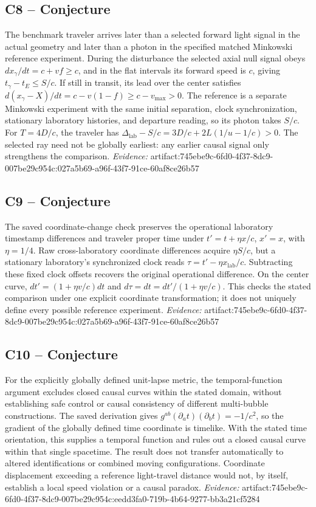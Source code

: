 \documentclass[11pt]{article}
\begin{document}
\subsection{C8 -- Conjecture}
The benchmark traveler arrives later than a selected forward light signal in the actual geometry and later than a photon in the specified matched Minkowski reference experiment.
During the disturbance the selected axial null signal obeys $dx_\gamma/dt=c+vf\geq c$, and in the flat intervals its forward speed is $c$, giving $t_\gamma-t_E\leq S/c$. If still in transit, its lead over the center satisfies $d(x_\gamma-X)/dt=c-v(1-f)\geq c-v_{\max}>0$. The reference is a separate Minkowski experiment with the same initial separation, clock synchronization, stationary laboratory histories, and departure reading, so its photon takes $S/c$. For $T=4D/c$, the traveler has $\Delta_{\mathrm{lab}}-S/c=3D/c+2L(1/u-1/c)>0$. The selected ray need not be globally earliest: any earlier causal signal only strengthens the comparison.
\textit{Evidence: }artifact:745ebe9c-6fd0-4f37-8dc9-007be29c954c:027a5b69-a96f-43f7-91ce-60af8ce26b57
\subsection{C9 -- Conjecture}
The saved coordinate-change check preserves the operational laboratory timestamp differences and traveler proper time under $t'=t+\eta x/c$, $x'=x$, with $\eta=1/4$.
Raw cross-laboratory coordinate differences acquire $\eta S/c$, but a stationary laboratory's synchronized clock reads $\tau=t'-\eta x_{\mathrm{lab}}/c$. Subtracting these fixed clock offsets recovers the original operational difference. On the center curve, $dt'=(1+\eta v/c)dt$ and $d\tau=dt=dt'/(1+\eta v/c)$. This checks the stated comparison under one explicit coordinate transformation; it does not uniquely define every possible reference experiment.
\textit{Evidence: }artifact:745ebe9c-6fd0-4f37-8dc9-007be29c954c:027a5b69-a96f-43f7-91ce-60af8ce26b57
\subsection{C10 -- Conjecture}
For the explicitly globally defined unit-lapse metric, the temporal-function argument excludes closed causal curves within the stated domain, without establishing safe control or causal consistency of different multi-bubble constructions.
The saved derivation gives $g^{ab}(\partial_at)(\partial_bt)=-1/c^2$, so the gradient of the globally defined time coordinate is timelike. With the stated time orientation, this supplies a temporal function and rules out a closed causal curve within that single spacetime. The result does not transfer automatically to altered identifications or combined moving configurations. Coordinate displacement exceeding a reference light-travel distance would not, by itself, establish a local speed violation or a causal paradox.
\textit{Evidence: }artifact:745ebe9c-6fd0-4f37-8dc9-007be29c954c:eedd3fa0-719b-4b64-9277-bb3a21cf5284
\end{document}
